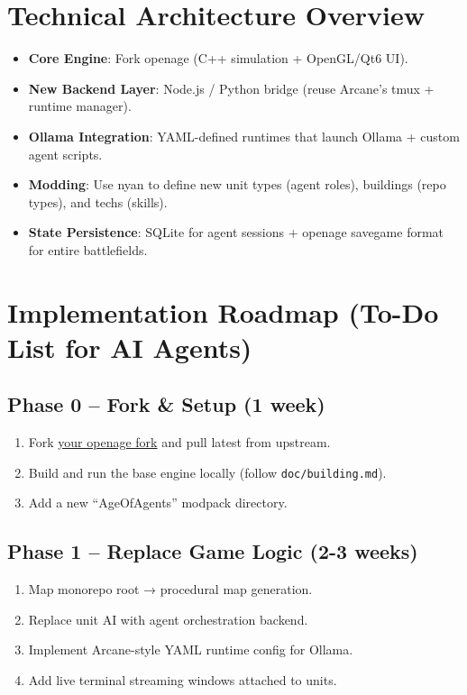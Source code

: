 \documentclass[11pt,a4paper]{article}
\begin{document}
\section{Technical Architecture Overview}

\begin{itemize}
    \item \textbf{Core Engine}: Fork openage (C++ simulation + OpenGL/Qt6 UI).
    \item \textbf{New Backend Layer}: Node.js / Python bridge (reuse Arcane's tmux + runtime manager).
    \item \textbf{Ollama Integration}: YAML-defined runtimes that launch Ollama + custom agent scripts.
    \item \textbf{Modding}: Use nyan to define new unit types (agent roles), buildings (repo types), and techs (skills).
    \item \textbf{State Persistence}: SQLite for agent sessions + openage savegame format for entire battlefields.
\end{itemize}

\section{Implementation Roadmap (To-Do List for AI Agents)}

\subsection{Phase 0 – Fork \& Setup (1 week)}
\begin{enumerate}
    \item Fork \href{https://github.com/DylanCkawalec/openage}{your openage fork} and pull latest from upstream.
    \item Build and run the base engine locally (follow \texttt{doc/building.md}).
    \item Add a new ``AgeOfAgents'' modpack directory.
\end{enumerate}

\subsection{Phase 1 – Replace Game Logic (2-3 weeks)}
\begin{enumerate}
    \item Map monorepo root → procedural map generation.
    \item Replace unit AI with agent orchestration backend.
    \item Implement Arcane-style YAML runtime config for Ollama.
    \item Add live terminal streaming windows attached to units.
\end{enumerate}
\end{document}

